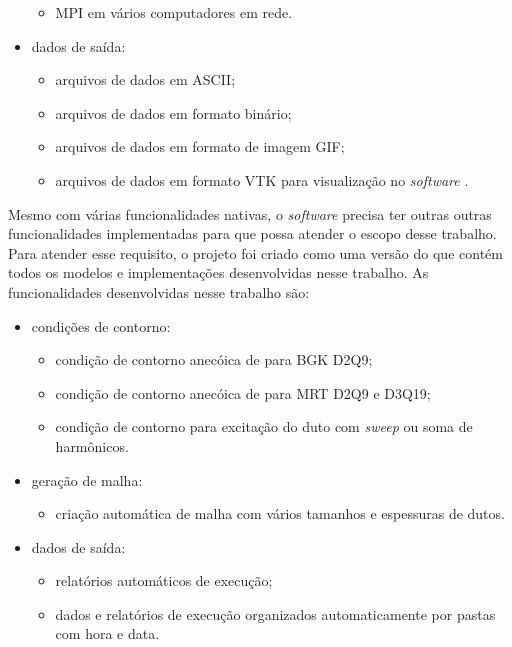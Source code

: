 \begin{itemize}
\begin{itemize}
    \item MPI em vários computadores em rede.
  \end{itemize}
  \item dados de saída:
  \begin{itemize}
    \item arquivos de dados em ASCII;
    \item arquivos de dados em formato binário;
    \item arquivos de dados em formato de imagem GIF;
    \item arquivos de dados em formato VTK para visualização no \textit{software} .
  \end{itemize}
\end{itemize}

Mesmo com várias funcionalidades nativas, o \textit{software}  precisa ter outras outras funcionalidades implementadas para que possa atender o escopo desse trabalho. Para atender esse requisito, o projeto  foi criado como uma versão do  que contém todos os modelos e implementações desenvolvidas nesse trabalho. As funcionalidades desenvolvidas nesse trabalho são:

\begin{itemize}
  
  \item condições de contorno:
  \begin{itemize}
    \item condição de contorno anecóica de  para BGK D2Q9;
    \item condição de contorno anecóica de  para MRT D2Q9 e D3Q19;
    \item condição de contorno para excitação do duto com \textit{sweep} ou soma de harmônicos.
  \end{itemize}

  \item geração de malha:
  \begin{itemize}
    \item criação automática de malha com vários tamanhos e espessuras de dutos.
  \end{itemize}

  \item dados de saída:
  \begin{itemize}
    \item relatórios automáticos de execução;
    \item dados e relatórios de execução organizados automaticamente por pastas com hora e data.
  \end{itemize}
\end{itemize}


